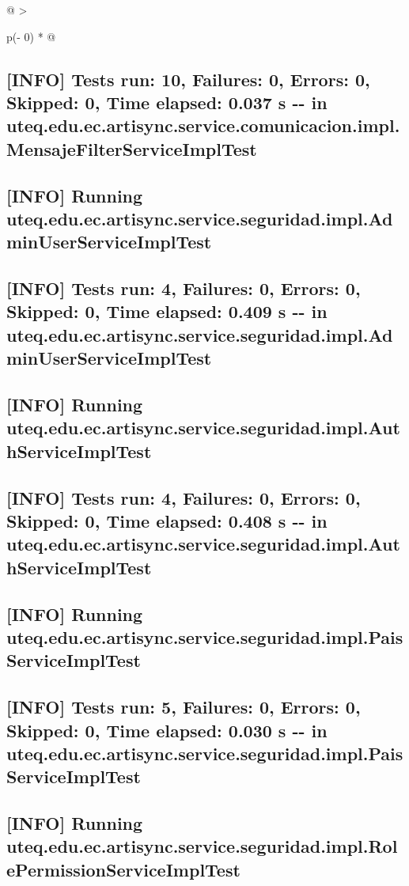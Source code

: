 \documentclass[
]{article}
\begin{document}
\begin{longtable}[]{@{}
  >{\raggedright\arraybackslash}p{(\columnwidth - 0\tabcolsep) * }@{}}
\begin{minipage}[b]{\linewidth}
\subsection{{[}INFO{]} Tests run: 10, Failures: 0, Errors: 0, Skipped:
0, Time elapsed: 0.037 s -\/- in
uteq.edu.ec.artisync.service.comunicacion.impl.MensajeFilterServiceImplTest}

\subsection{{[}INFO{]} Running
uteq.edu.ec.artisync.service.seguridad.impl.AdminUserServiceImplTest}

\subsection{{[}INFO{]} Tests run: 4, Failures: 0, Errors: 0, Skipped: 0,
Time elapsed: 0.409 s -\/- in
uteq.edu.ec.artisync.service.seguridad.impl.AdminUserServiceImplTest}

\subsection{{[}INFO{]} Running
uteq.edu.ec.artisync.service.seguridad.impl.AuthServiceImplTest}

\subsection{{[}INFO{]} Tests run: 4, Failures: 0, Errors: 0, Skipped: 0,
Time elapsed: 0.408 s -\/- in
uteq.edu.ec.artisync.service.seguridad.impl.AuthServiceImplTest}

\subsection{{[}INFO{]} Running
uteq.edu.ec.artisync.service.seguridad.impl.PaisServiceImplTest}

\subsection{{[}INFO{]} Tests run: 5, Failures: 0, Errors: 0, Skipped: 0,
Time elapsed: 0.030 s -\/- in
uteq.edu.ec.artisync.service.seguridad.impl.PaisServiceImplTest}

\subsection{{[}INFO{]} Running
uteq.edu.ec.artisync.service.seguridad.impl.RolePermissionServiceImplTest}


\end{minipage}
\end{longtable}
\end{document}
